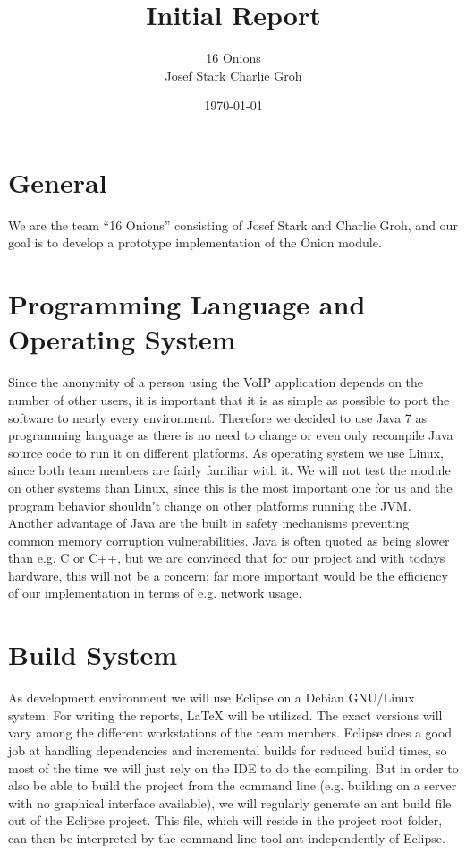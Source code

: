 \documentclass{article}
\begin{document}
\title{\Huge Initial Report \normalsize}
\date{\today}
\author{\LARGE 16 Onions \normalsize \\[5pt] Josef Stark \hspace{20pt} Charlie Groh}
\maketitle
{\let\thefootnote\relax{}}

\section{General}
We are the team ``16 Onions'' consisting of Josef Stark and Charlie Groh,
and our goal is to develop a prototype implementation of the Onion module.

\section{Programming Language and Operating System}
Since the anonymity of a person using the VoIP application depends on the
number of other users, it is important that it is as simple as possible to port
the software to nearly every environment. Therefore we decided to use Java 7
as programming language as there is no need to change or even only recompile Java source code to run it on different platforms. As operating system we use Linux, since both team members are fairly familiar with it. We will not
test the module on other systems than Linux, since this is the most important one for us and the program behavior shouldn't change on other platforms running the JVM. Another advantage of Java are the built in safety mechanisms preventing common memory corruption vulnerabilities. 
Java is often quoted as being slower than e.g. C or C++, but we are convinced that for our project and with todays hardware, this will not be a concern; far more important would be the efficiency of our implementation in terms of e.g. network usage.

\section{Build System}
As development environment we will use Eclipse on a Debian GNU/Linux system. For
writing the reports, LaTeX will be utilized. The exact versions will vary among
the different workstations of the team members.
Eclipse does a good job at handling dependencies and incremental builds for reduced build times, so most of the time we will just rely on the IDE to do the compiling. But in order to also be able to build the project from the command line (e.g. building on a server with no graphical interface available), we will regularly generate an ant build file out of the Eclipse project. This file, which will reside in the project root folder, can then be interpreted by the command line tool ant independently of Eclipse.
\end{document}

